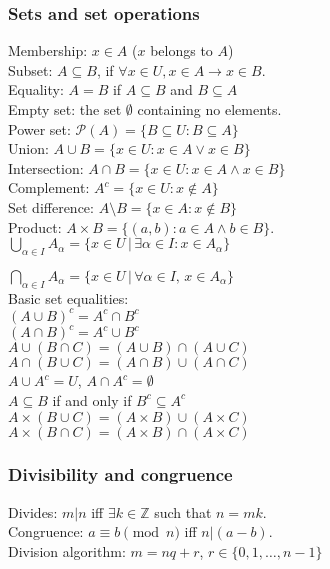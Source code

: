 \documentclass[letterpaper,8pt,landscape]{article}
\begin{document}
\begin{multicols}{3}
\subsubsection*{Sets and set operations}
{Membership}: $x\in A$ ($x$ belongs to $A$)\\
{Subset}: $A\subseteq B$, if $\forall x\in U, x\in A\to x\in B$.\\
{Equality}: $A=B$ if $A\subseteq B$ and $B\subseteq A$\\
{Empty set}: the set $\emptyset$ containing no elements.\\
{Power set}: $\mathcal{P}(A) = \{B\subseteq U : B\subseteq A\}$\\
{Union}: $A\cup B = \{x\in U : x\in A \vee x\in B\}$\\
{Intersection}: $A\cap B = \{x\in U : x\in A\wedge x\in B\}$\\
{Complement}: $A^c = \{x\in U : x\notin A\}$\\
{Set difference}: $A\setminus B = \{x\in A : x\notin B\}$\\
{Product}: $A\times B = \{(a,b) : a\in A \wedge b\in B\}$.\\

$\bigcup_{\alpha\in I}A_\alpha = \{x\in U \,|\, \exists \alpha\in I : x\in A_\alpha\}$

$\bigcap_{\alpha\in I}A_\alpha = \{x\in U \,|\, \forall \alpha \in I,\, x\in A_\alpha\}$\\

\noindent Basic set equalities:\\
$(A\cup B)^c = A^c\cap B^c$\\
$(A\cap B)^c = A^c\cup B^c$\\
$A\cup (B\cap C) = (A\cup B)\cap (A\cup C)$\\
$A\cap (B\cup C) = (A\cap B)\cup (A\cap C)$\\
$A\cup A^c = U$, $A\cap A^c = \emptyset$\\
$A\subseteq B$ if and only if $B^c\subseteq A^c$\\
$A\times (B\cup C) = (A\times B)\cup (A\times C)$\\
$A\times (B\cap C) = (A\times B)\cap (A\times C)$

\subsubsection*{Divisibility and congruence}
Divides: $m|n$ iff $\exists k\in\mathbb{Z}$ such that $n=mk$.\\
Congruence: $a\equiv b \pmod{n}$ iff $n|(a-b)$.\\
Division algorithm: $m=nq+r$, $r\in \{0,1,\ldots, n-1\}$


\end{multicols}
\end{document}
